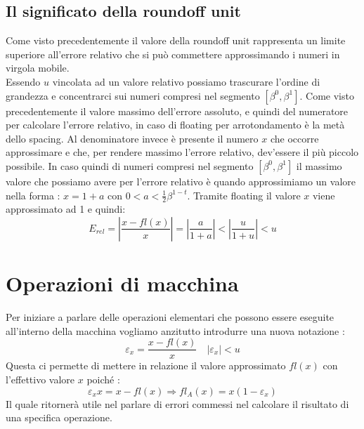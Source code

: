 \documentclass[12pt, a4paper]{book}
\theoremstyle{definition}
\begin{document}
\subsection{Il significato della roundoff unit}
\begin{flushleft}
Come visto precedentemente il valore della roundoff unit rappresenta un limite superiore all'errore relativo che si può commettere approssimando i numeri in virgola mobile. \\
Essendo $u$ vincolata ad un valore relativo possiamo trascurare l'ordine di grandezza e concentrarci sui numeri compresi nel segmento $[\beta^{0}, \beta^{1}].$
Come visto precedentemente il valore massimo dell'errore assoluto, e quindi del numeratore per calcolare l'errore relativo,  in caso di floating per arrotondamento è la metà dello spacing.
Al denominatore invece è presente il numero $x$ che occorre approssimare e che,  per rendere massimo l'errore relativo, dev'essere il più piccolo possibile. 
In caso quindi di numeri compresi nel segmento $[\beta^{0}, \beta^{1}]$ il massimo valore che possiamo avere per l'errore relativo è quando approssimiamo un valore nella forma : $x = 1 + a$ con  $0 < a <  \frac{1}{2}\beta^{1-t}.$
Tramite floating il valore $x$ viene approssimato ad 1 e quindi:
\[
	E_{rel} = \displaystyle\left\lvert \frac{x - fl(x)}{x} \right\rvert = \displaystyle\left\lvert \frac{a}{1+a} \right\rvert < \displaystyle\left\lvert \frac{u}{1+u} \right\rvert < u 
\]
\end{flushleft}

\section{Operazioni di macchina}
\begin{flushleft}
Per iniziare a parlare delle operazioni elementari che possono essere eseguite all'interno della macchina vogliamo anzitutto introdurre una nuova notazione : 
\[ \varepsilon_{x} = \frac{x - fl(x)}{x} \quad |\varepsilon_{x}| < u \]
Questa ci permette di mettere in relazione il valore approssimato $fl(x)$ con l'effettivo valore $x$ poiché :
\[  \varepsilon_{x}x =  x - fl(x) \Longrightarrow fl_{A}(x) = x(1 - \varepsilon_{x}) \]
Il quale ritornerà utile nel parlare di errori commessi nel calcolare il risultato di una specifica operazione.
\end{flushleft}
\end{document}
